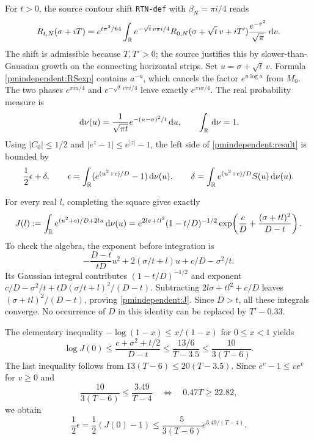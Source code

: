 For $t>0$, the source contour shift \texttt{RTN-def} with
$\beta_N=\pi i/4$ reads
\[
 R_{t,N}(\sigma+iT)=e^{t\pi^2/64}
 \int_\mathbb R e^{-\sqrt t\,v\pi i/4}
 R_{0,N}(\sigma+\sqrt t\,v+iT')
                         \frac{e^{-v^2}}{\sqrt\pi}\,\mathrm d v.
\]
The shift is admissible because $T,T'>0$; the source justifies
this by slower-than-Gaussian growth on the connecting horizontal
strips. Set $u=\sigma+\sqrt t\,v$. Formula \eqref{pmindependent:RSexp} contains
$a^{-u}$, which cancels the factor $e^{u\log a}$ from $M_0$.
The two phases $e^{\pi iu/4}$ and $e^{-\sqrt t\,v\pi i/4}$
leave exactly $e^{\pi i\sigma/4}$. The real probability measure is
\[
 \,\mathrm d\nu(u)=\frac1{\sqrt{\pi t}}e^{-(u-\sigma)^2/t}\,\mathrm d u,
 \qquad \int_\mathbb R\,\mathrm d\nu=1.
\]
Using $|C_0|\le1/2$ and $|e^z-1|\le e^{|z|}-1$, the left
side of \eqref{pmindependent:result} is bounded by
\begin{equation}\label{pmindependent:epsdelta}
 \frac12\epsilon+\delta,\qquad
 \epsilon=\int_\mathbb R(e^{(u^2+c)/D}-1)\,\mathrm d\nu(u),\qquad
 \delta=\int_\mathbb R e^{(u^2+c)/D}S(u)\,\mathrm d\nu(u).
\end{equation}

For every real $l$, completing the square gives exactly
\begin{equation}\label{pmindependent:J}
 J(l):=\int_\mathbb R e^{(u^2+c)/D+2lu}\,\mathrm d\nu(u)
 =e^{2l\sigma+tl^2}(1-t/D)^{-1/2}
       \exp\!\left(\frac cD+\frac{(\sigma+tl)^2}{D-t}\right).
\end{equation}
To check the algebra, the exponent before integration is
\[
 -\frac{D-t}{tD}u^2+2(\sigma/t+l)u+c/D-\sigma^2/t.
\]
Its Gaussian integral contributes $(1-t/D)^{-1/2}$ and exponent
$c/D-\sigma^2/t+tD(\sigma/t+l)^2/(D-t)$.
Subtracting $2l\sigma+tl^2+c/D$ leaves
$(\sigma+tl)^2/(D-t)$, proving \eqref{pmindependent:J}. Since $D>t$,
all these integrals converge. No occurrence of $D$ in this identity
can be replaced by $T'-0.33$.

The elementary inequality $-\log(1-x)\le x/(1-x)$ for
$0\le x<1$ yields
\[
 \log J(0)\le\frac{c+\sigma^2+t/2}{D-t}
 \le\frac{13/6}{T-3.5}\le\frac{10}{3(T-6)}.
\]
The last inequality follows from $13(T-6)\le20(T-3.5)$.
Since $e^v-1\le ve^v$ for $v\ge0$ and
\[
 \frac{10}{3(T-6)}\le\frac{3.49}{T-4}
 \quad\Longleftrightarrow\quad 0.47T\ge22.82,
\]
we obtain
\begin{equation}\label{pmindependent:epsilonfinal}
 \frac12\epsilon=\frac12(J(0)-1)
       \le\frac5{3(T-6)}e^{3.49/(T-4)}.
\end{equation}

